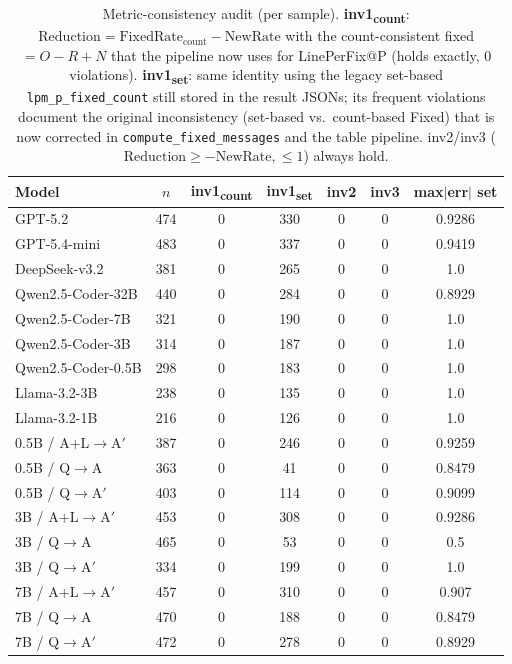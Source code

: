 \begin{table}[t]
\centering
\small
\begin{tabular}{lcccccc}
\toprule
\textbf{Model} & $n$ & \textbf{inv1\textsubscript{count}} & \textbf{inv1\textsubscript{set}} & inv2 & inv3 & max$|$err$|$ set\\
\midrule
GPT-5.2 & 474 & 0 & 330 & 0 & 0 & 0.9286 \\
GPT-5.4-mini & 483 & 0 & 337 & 0 & 0 & 0.9419 \\
DeepSeek-v3.2 & 381 & 0 & 265 & 0 & 0 & 1.0 \\
Qwen2.5-Coder-32B & 440 & 0 & 284 & 0 & 0 & 0.8929 \\
Qwen2.5-Coder-7B & 321 & 0 & 190 & 0 & 0 & 1.0 \\
Qwen2.5-Coder-3B & 314 & 0 & 187 & 0 & 0 & 1.0 \\
Qwen2.5-Coder-0.5B & 298 & 0 & 183 & 0 & 0 & 1.0 \\
Llama-3.2-3B & 238 & 0 & 135 & 0 & 0 & 1.0 \\
Llama-3.2-1B & 216 & 0 & 126 & 0 & 0 & 1.0 \\
0.5B / A+L$\rightarrow$A$'$ & 387 & 0 & 246 & 0 & 0 & 0.9259 \\
0.5B / Q$\rightarrow$A & 363 & 0 & 41 & 0 & 0 & 0.8479 \\
0.5B / Q$\rightarrow$A$'$ & 403 & 0 & 114 & 0 & 0 & 0.9099 \\
3B / A+L$\rightarrow$A$'$ & 453 & 0 & 308 & 0 & 0 & 0.9286 \\
3B / Q$\rightarrow$A & 465 & 0 & 53 & 0 & 0 & 0.5 \\
3B / Q$\rightarrow$A$'$ & 334 & 0 & 199 & 0 & 0 & 1.0 \\
7B / A+L$\rightarrow$A$'$ & 457 & 0 & 310 & 0 & 0 & 0.907 \\
7B / Q$\rightarrow$A & 470 & 0 & 188 & 0 & 0 & 0.8479 \\
7B / Q$\rightarrow$A$'$ & 472 & 0 & 278 & 0 & 0 & 0.8929 \\
\bottomrule
\end{tabular}
\caption{Metric-consistency audit (per sample). \textbf{inv1\textsubscript{count}}: $\mathrm{Reduction}=\mathrm{FixedRate_{count}}-\mathrm{NewRate}$ with the count-consistent fixed $=O{-}R{+}N$ that the pipeline now uses for LinePerFix@P (holds exactly, 0 violations). \textbf{inv1\textsubscript{set}}: same identity using the legacy set-based \texttt{lpm\_p\_fixed\_count} still stored in the result JSONs; its frequent violations document the original inconsistency (set-based vs.\ count-based Fixed) that is now corrected in \texttt{compute\_fixed\_messages} and the table pipeline. inv2/inv3 ($\mathrm{Reduction}\ge{-}\mathrm{NewRate},\le1$) always hold.}
\label{tab:metric_invariant_audit}
\end{table}